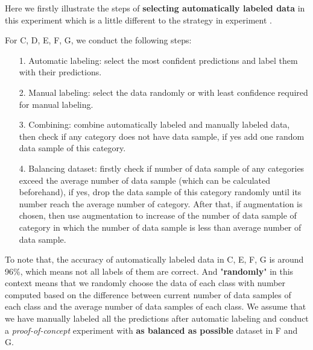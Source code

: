 Here we firstly illustrate the steps of \textbf{selecting automatically labeled data} in this experiment which is a little different to the strategy in experiment . 

For C, D, E, F, G, we conduct the following steps:
\begin{itemize}
	\item[1.] Automatic labeling: select the most confident predictions and label them with their predictions.
	\item[2.] Manual labeling: select the data randomly or with least confidence required for manual labeling.
	\item[3.] Combining: combine automatically labeled and manually labeled data, then check if any category does not have data sample, if yes add one random data sample of this category.
	\item[4.] Balancing dataset: firstly check if number of data sample of any categories exceed the average number of data sample (which can be calculated beforehand), if yes, drop the data sample of this category randomly until its number reach the average number of category. After that, if augmentation is chosen, then use augmentation to increase of the number of data sample of category in which the number of data sample is less than average number of data sample.

\end{itemize}
To note that, the accuracy of automatically labeled data in C, E, F, G is around 96\%, which means not all labels of them are correct. And "\textbf{randomly}" in this context means that we randomly choose the data of each class with number computed based on the difference between current number of data samples of each class and the average number of data samples of each class. We assume that we have manually labeled all the predictions after automatic labeling and conduct a \textit{proof-of-concept} experiment with \textbf{as balanced as possible} dataset in F and G.    

